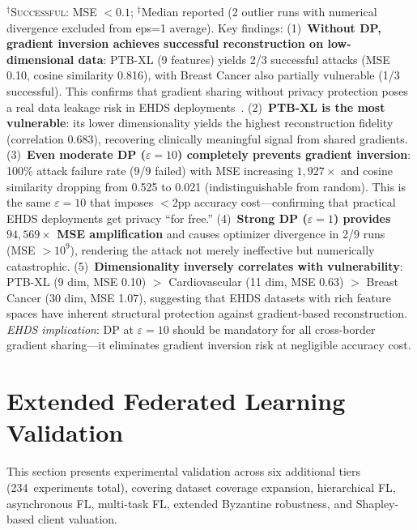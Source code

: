 \documentclass[conference,a4paper]{IEEEtran}
\begin{document}
\begin{table}[htbp]
\vspace{1mm}
\footnotesize{$^\dagger$\textsc{Successful}: MSE $< 0.1$; $^\ddagger$Median reported (2 outlier runs with numerical divergence excluded from eps=1 average). Key findings: (1)~\textbf{Without DP, gradient inversion achieves successful reconstruction on low-dimensional data}: PTB-XL (9 features) yields 2/3 successful attacks (MSE 0.10, cosine similarity 0.816), with Breast Cancer also partially vulnerable (1/3 successful). This confirms that gradient sharing without privacy protection poses a real data leakage risk in EHDS deployments~\cite{geiping2020inverting}. (2)~\textbf{PTB-XL is the most vulnerable}: its lower dimensionality yields the highest reconstruction fidelity (correlation 0.683), recovering clinically meaningful signal from shared gradients. (3)~\textbf{Even moderate DP ($\varepsilon{=}10$) completely prevents gradient inversion}: 100\% attack failure rate (9/9 failed) with MSE increasing $1{,}927\times$ and cosine similarity dropping from 0.525 to 0.021 (indistinguishable from random). This is the same $\varepsilon{=}10$ that imposes $<$2pp accuracy cost---confirming that practical EHDS deployments get privacy ``for free.'' (4)~\textbf{Strong DP ($\varepsilon{=}1$) provides $94{,}569\times$ MSE amplification} and causes optimizer divergence in 2/9 runs (MSE $>10^{9}$), rendering the attack not merely ineffective but numerically catastrophic. (5)~\textbf{Dimensionality inversely correlates with vulnerability}: PTB-XL (9 dim, MSE 0.10) $>$ Cardiovascular (11 dim, MSE 0.63) $>$ Breast Cancer (30 dim, MSE 1.07), suggesting that EHDS datasets with rich feature spaces have inherent structural protection against gradient-based reconstruction. \textit{EHDS implication}: DP at $\varepsilon{=}10$ should be mandatory for all cross-border gradient sharing---it eliminates gradient inversion risk at negligible accuracy cost.}
\end{table}

\section{Extended Federated Learning Validation}
\label{sec:cascade6}

This section presents experimental validation across six additional tiers (234~experiments total), covering dataset coverage expansion, hierarchical FL, asynchronous FL, multi-task FL, extended Byzantine robustness, and Shapley-based client valuation.
\end{document}
